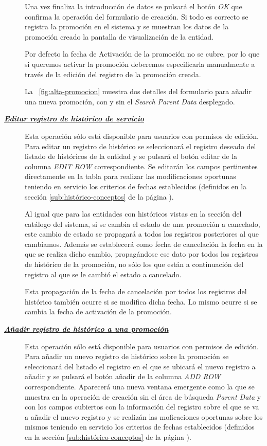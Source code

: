 \begin{description}
Una vez finaliza la introducción de datos se pulsará el botón \emph{OK} que confirma la operación del formulario de creación. Si todo es correcto se registra la promoción en el sistema y se muestran los datos de la promoción creado la pantalla de visualización de la entidad.

Por defecto la fecha de Activación de la promoción no se cubre, por lo que si queremos activar la promoción deberemos especificarla manualmente a través de la edición del registro de la promoción creada.

La \figurename~\ref{fig:alta-promocion} muestra dos detalles del formulario para añadir una nueva promoción, con y sin el \emph{Search Parent Data} desplegado.

\item[\underline{\textsl{\textbf{Editar registro de histórico de servicio}}}] Esta operación sólo está disponible para usuarios con permisos de edición.
Para editar un registro de histórico se seleccionará el registro deseado del listado de históricos de la entidad y se pulsará el botón editar de la columna \textit{EDIT ROW} correspondiente. Se editarán los campos pertinentes directamente en la tabla para realizar las modificaciones oportunas teniendo en servicio los criterios de fechas establecidos (definidos en la sección \ref{sub:histórico-conceptos} de la página \pageref{sub:histórico-conceptos}).

Al igual que para las entidades con históricos vistas en la sección del catálogo del sistema, si se cambia el estado de una promoción a cancelado, este cambio de estado se propagará a todos los registros posteriores al que cambiamos. Además se establecerá como fecha de cancelación la fecha en la que se realiza dicho cambio, propagándose ese dato por todos los registros de histórico de la promoción, no sólo los que están a continuación del registro al que se le cambió el estado a cancelado.

Esta propagación de la fecha de cancelación por todos los registros del histórico  también ocurre si se modifica dicha fecha. Lo mismo ocurre si se cambia la fecha de activación de la promoción.

\item[\underline{\textsl{\textbf{Añadir registro de histórico a una promoción}}}] Esta operación sólo está disponible para usuarios con permisos de edición.
Para añadir un nuevo registro de histórico sobre la promoción se seleccionará del listado el registro en el que se ubicará el nuevo registro a añadir y se pulsará el botón añadir de la columna \textit{ADD ROW} correspondiente. Aparecerá una nueva ventana emergente como la que se muestra en la operación de creación sin el área de búsqueda \emph{Parent Data} y con los campos cubiertos con la información del registro sobre el que se va a añadir el nuevo registro y se realizán las moficaciones oportunas sobre los mismos teniendo en servicio los criterios de fechas establecidos (definidos en la sección \ref{sub:histórico-conceptos} de la página \pageref{sub:histórico-conceptos}).


\end{description}
